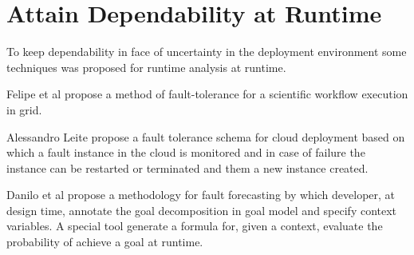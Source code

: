 
\section{Attain Dependability at Runtime }
To keep dependability in face of uncertainty in the deployment environment some techniques was proposed for runtime analysis at runtime.

Felipe et al\cite{guimaraes_framework_2013} propose a method of fault-tolerance for a scientific workflow execution in grid.

Alessandro Leite \cite{ferreira_leite_user_2014} propose a fault tolerance schema for cloud deployment based on which a fault instance in the cloud is monitored and in case of failure the instance can be restarted or terminated and them a new instance created.

Danilo et al\cite{mendonca_dependability_2015} propose a methodology for fault forecasting by which developer, at design time, annotate the goal decomposition in goal model and specify context variables. A special tool generate a formula for, given a context, evaluate the probability of achieve a goal at runtime.



